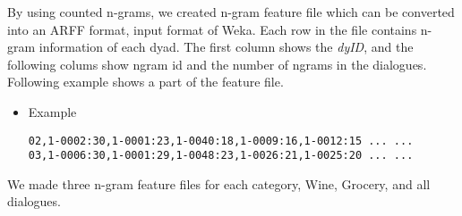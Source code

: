 \documentclass[11pt]{article} %
\begin{document}
\begin{itemize}
By using counted n-grams, we created n-gram feature file which can be converted into an ARFF format, input format of Weka. Each row in the file contains n-gram information of each dyad. The first column shows the \textit{dyID}, and the following colums show ngram id and the number of ngrams in the dialogues. Following example shows a part of the feature file. 
\begin{itemize}
\item Example
\begin{verbatim}
02,1-0002:30,1-0001:23,1-0040:18,1-0009:16,1-0012:15 ... ...
03,1-0006:30,1-0001:29,1-0048:23,1-0026:21,1-0025:20 ... ...
\end{verbatim}
\end{itemize} 
We made three n-gram feature files for each category, Wine, Grocery, and all dialogues.
\end{itemize}
\end{document}
